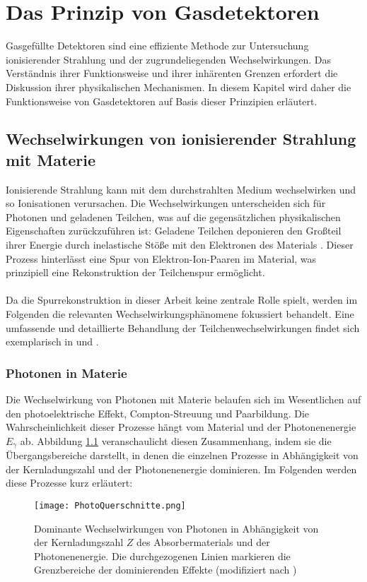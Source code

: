 \chapter{Das Prinzip von Gasdetektoren}

\noindent Gasgefüllte Detektoren sind eine effiziente Methode zur Untersuchung ionisierender Strahlung und der zugrundeliegenden Wechselwirkungen. Das Verständnis ihrer Funktionsweise und ihrer inhärenten Grenzen erfordert die Diskussion ihrer physikalischen Mechanismen. In diesem Kapitel wird daher die Funktionsweise von Gasdetektoren auf Basis dieser Prinzipien erläutert.

	\section{Wechselwirkungen von ionisierender Strahlung mit Materie}
	Ionisierende Strahlung kann mit dem durchstrahlten Medium wechselwirken und so Ionisationen verursachen. Die Wechselwirkungen unterscheiden sich für Photonen und geladenen Teilchen, was auf die gegensätzlichen physikalischen Eigenschaften zurückzuführen ist: Geladene Teilchen deponieren den Großteil ihrer Energie durch inelastische Stöße mit den Elektronen des Materials \cite{Leo}. Dieser Prozess hinterlässt eine Spur von Elektron-Ion-Paaren im Material, was prinzipiell eine Rekonstruktion der Teilchenspur ermöglicht.\\
	\\
	Da die Spurrekonstruktion in dieser Arbeit keine zentrale Rolle spielt, werden im Folgenden die relevanten Wechselwirkungsphänomene fokussiert behandelt. Eine umfassende und detaillierte Behandlung der Teilchenwechselwirkungen findet sich exemplarisch in \cite{Leo} und \cite{Sauli_Multiwire}.

	\subsection{Photonen in Materie} \label{chap:Photonen}
	Die Wechselwirkung von Photonen mit Materie belaufen sich im Wesentlichen auf den photoelektrische Effekt, Compton-Streuung und Paarbildung. Die Wahrscheinlichkeit dieser Prozesse hängt vom Material und der Photonenenergie $E_{\gamma}$ ab. Abbildung \ref{fig:WirkungsquerschnittePhotonen} veranschaulicht diesen Zusammenhang, indem sie die Übergangsbereiche darstellt, in denen die einzelnen Prozesse in Abhängigkeit von der Kernladungszahl und der Photonenenergie dominieren. Im Folgenden werden diese Prozesse kurz erläutert:
	\begin{figure}[h]
		\centering
		\texttt{[image: PhotoQuerschnitte.png]}
		\caption{Dominante Wechselwirkungen von Photonen in Abhängigkeit von der Kernladungszahl $Z$ des Absorbermaterials und der Photonenenergie. Die durchgezogenen Linien markieren die Grenzbereiche der dominierenden Effekte (modifiziert nach \cite{DemtroderKerne})}
		\label{fig:WirkungsquerschnittePhotonen}
	\end{figure}
	
